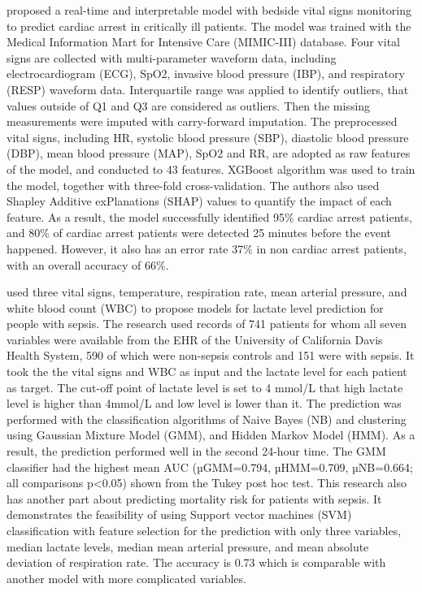 \documentclass[12pt,a4paper,english
]{tunithesis}
\begin{document}
\textcite{yijing2022} proposed a real-time and interpretable model with bedside vital signs monitoring to predict cardiac arrest in critically ill patients. The model was trained with the Medical Information Mart for Intensive Care (MIMIC-III) database. Four vital signs are collected with multi-parameter waveform data, including electrocardiogram (ECG), SpO2, invasive blood pressure (IBP), and respiratory (RESP) waveform data. Interquartile range was applied to identify outliers, that values outside of Q1 and Q3 are considered as outliers. Then the missing measurements were imputed with carry-forward imputation. The preprocessed vital signs, including HR, systolic blood pressure (SBP), diastolic blood pressure (DBP), mean blood pressure (MAP), SpO2 and RR, are adopted as raw features of the model, and conducted to 43 features. XGBoost algorithm was used to train the model, together with three-fold cross-validation. The authors also used Shapley Additive exPlanations (SHAP) values to quantify the impact of each feature. As a result, the model successfully identified 95\% cardiac arrest patients, and 80\% of cardiac arrest patients were detected 25 minutes before the event happened. However, it also has an error rate 37\% in non cardiac arrest patients, with an overall accuracy of 66\%.

\textcite{gultepe2013} used three vital signs, temperature, respiration rate, mean arterial pressure, and white blood count (WBC) to propose models for lactate level prediction for people with sepsis. The research used records of 741 patients for whom all seven variables were available from the EHR of the University of California Davis Health System, 590 of which were non-sepsis controls and 151 were with sepsis. It took the the vital signs and WBC as input and the lactate level for each patient as target. The cut-off point of lactate level is set to 4 mmol/L that high lactate level is higher than 4mmol/L and low level is lower than it. The prediction was performed with the classification algorithms of Naive Bayes (NB) and clustering using Gaussian Mixture Model (GMM), and Hidden Markov Model (HMM). As a result, the prediction performed well in the second 24-hour time. The GMM classifier had the highest mean AUC (µGMM=0.794, µHMM=0.709, µNB=0.664; all comparisons p<0.05) shown from the Tukey post hoc test. This research also has another part about predicting mortality risk for patients with sepsis. It demonstrates the feasibility of using Support vector machines (SVM) classification with feature selection for the prediction with only three variables, median lactate levels, median mean arterial pressure, and mean absolute deviation of respiration rate. The accuracy is 0.73 which is comparable with another model with more complicated variables.
\end{document}
